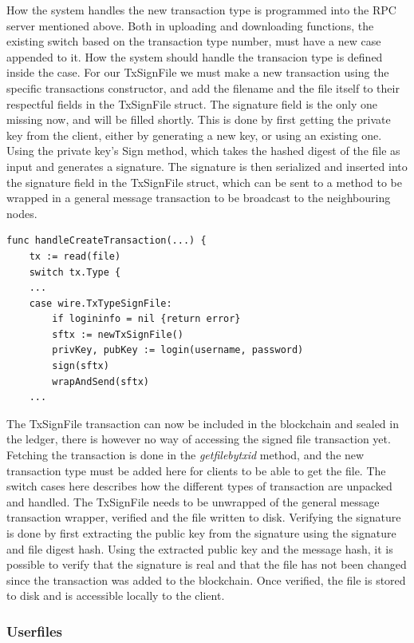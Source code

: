 \documentclass[12pt]{article}
\begin{document}
How the system handles the new transaction type is programmed into the RPC server mentioned above. Both in uploading and downloading functions, the existing switch based on the transaction type number, must have a new case appended to it. How the system should handle the transacion type is defined inside the case. For our TxSignFile we must make a new transaction using the specific transactions constructor, and add the filename and the file itself to their respectful fields in the TxSignFile struct. The signature field is the only one missing now, and will be filled shortly. This is done by first getting the private key from the client, either by generating a new key, or using an existing one. Using the private key's Sign method, which takes the hashed digest of the file as input and generates a signature. The signature is then serialized and inserted into the signature field in the TxSignFile struct, which can be sent to a method to be wrapped in a general message transaction to be broadcast to the neighbouring nodes. 
\begin{lstlisting}[float=h!,caption={Pseudo code of the signed file case in createtransaction},label=lst:crtx]
func handleCreateTransaction(...) {
	tx := read(file)
	switch tx.Type {
	...
	case wire.TxTypeSignFile:
		if logininfo = nil {return error}
		sftx := newTxSignFile()
		privKey, pubKey := login(username, password)
		sign(sftx)
		wrapAndSend(sftx)
	...

\end{lstlisting}
The TxSignFile transaction can now be included in the blockchain and sealed in the ledger, there is however no way of accessing the signed file transaction yet. Fetching the transaction is done in the \textit{getfilebytxid} method, and the new transaction type must be added here for clients to be able to get the file. The switch cases here describes how the different types of transaction are unpacked and handled. The TxSignFile needs to be unwrapped of the general message transaction wrapper, verified and the file written to disk. Verifying the signature is done by first extracting the public key from the signature using the signature and file digest hash. Using the extracted public key and the message hash, it is possible to verify that the signature is real and that the file has not been changed since the transaction was added to the blockchain. Once verified, the file is stored to disk and is accessible locally to the client. 

\subsubsection{Userfiles}\label{subsubsec:userfiles}
\end{document}
